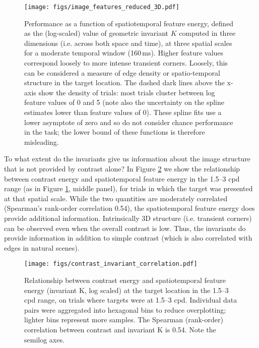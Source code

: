\documentclass[11pt,a4paper]{article}
\begin{document}
\begin{figure}[H]
\begin{center}
\texttt{[image: figs/image\_features\_reduced\_3D.pdf]}
\end{center}
\caption{
Performance as a function of spatiotemporal feature energy, defined as the (log-scaled) value of geometric invariant $K$ computed in three dimensions (i.e. across both space and time), at three spatial scales for a moderate temporal window (160\,ms).
Higher feature values correspond loosely to more intense transient corners.
Loosely, this can be considered a measure of edge density or spatio-temporal structure in the target location.
The dashed dark lines above the x-axis show the density of trials: most trials cluster between log feature values of 0 and 5 (note also the uncertainty on the spline estimates lower than feature values of 0).
These spline fits use a lower asymptote of zero and so do not consider chance performance in the task; the lower bound of these functions is therefore misleading.
}
\label{fig:image_features_K}
\end{figure}

To what extent do the invariants give us information about the image structure that is not provided by contrast alone? 
In Figure \ref{fig:image_features_correlation} we show the relationship between contrast energy and spatiotemporal feature energy in the 1.5--3 cpd range (as in Figure \ref{fig:image_features_K}, middle panel), for trials in which the target was presented at that spatial scale.
While the two quantities are moderately correlated (Spearman's rank-order correlation 0.54), the spatiotemporal feature energy does provide additional information.
Intrinsically 3D structure (i.e. transient corners) can be observed even when the overall contrast is low.
Thus, the invariants do provide information in addition to simple contrast (which is also correlated with edges in natural scenes).

\begin{figure}[H]
\begin{center}
\texttt{[image: figs/contrast\_invariant\_correlation.pdf]}
\end{center}
\caption{
Relationship between contrast energy and spatiotemporal feature energy (invariant K, log scaled) at the target location in the 1.5--3 cpd range, on trials where targets were at 1.5--3 cpd.
Individual data pairs were aggregated into hexagonal bins to reduce overplotting; lighter bins represent more samples.
The Spearman (rank-order) correlation between contrast and invariant K is 0.54.
Note the semilog axes.
}
\label{fig:image_features_correlation}
\end{figure}
\end{document}
